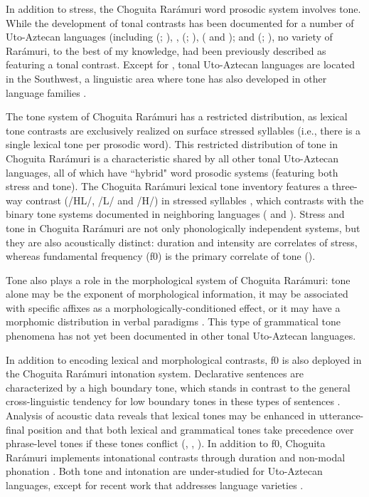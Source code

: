In addition to stress, the Choguita Rarámuri word prosodic system involves tone. While the development of tonal contrasts has been documented for a number of {Uto-Aztecan} languages (including  (; \citet{woo1970tone}),  \citep{manaster1986genesis},  (; \citet{grimes1959huichol}),  ( \citep{demers1999prominence} and  \citep{hagberg1989floating}); and  (; \citet{guion2010word}), no variety of Rarámuri, to the best of my knowledge, had been previously described as featuring a tonal contrast. Except for , tonal {Uto-Aztecan} languages are located in the Southwest, a linguistic area where tone has also developed in other language families \citep{caballero2020oxford}.

The tone system of Choguita Rarámuri has a restricted distribution, as lexical tone contrasts are exclusively realized on surface stressed syllables (i.e., there is a single lexical tone per prosodic word). This restricted distribution of tone in Choguita Rarámuri is a characteristic shared by all other tonal {Uto-Aztecan} languages, all of which have ``hybrid" word prosodic systems (featuring both stress and tone). The Choguita Rarámuri lexical tone inventory features a three-way contrast (/HL/, /L/ and /H/) in stressed syllables \citep{caballero2015tone}, which contrasts with the binary tone systems documented in neighboring  languages ( and ). Stress and tone in Choguita Rarámuri are not only phonologically independent systems, but they are also acoustically distinct: duration and intensity are correlates of stress, whereas fundamental frequency (f0) is the primary correlate of tone (\citealt{caballero2015tone}).

Tone also plays a role in the morphological system of Choguita Rarámuri: tone alone may be the exponent of morphological information, it may be associated with specific affixes as a morphologically-conditioned effect, or it may have a morphomic distribution in verbal paradigms \citep{caballero2021grammatical}. This type of grammatical tone phenomena has not yet been documented in other tonal {Uto-Aztecan} languages.

In addition to encoding lexical and morphological contrasts, f0 is also deployed in the Choguita Rarámuri intonation system. Declarative sentences are characterized by a high boundary tone, which stands in contrast to the general cross-linguistic tendency for low boundary tones in these types of sentences \citep{jun2014prosodic}. Analysis of acoustic data reveals that lexical tones may be enhanced in utterance-final position and that both lexical and grammatical tones take precedence over phrase-level tones if these tones conflict (\cite{caballero2014tone}, \cite{aguilar2015multi}, \cite{garellek2015lexical}). In addition to f0, Choguita Rarámuri implements intonational contrasts through duration and non-modal phonation \citep{aguilar2015multi,kubuzono2020raramuri}. Both tone and intonation are under-studied for {Uto-Aztecan} languages, except for recent work that addresses  language varieties \citep{guion2010word,patino2014intonation,aguilar2020phonology}.

